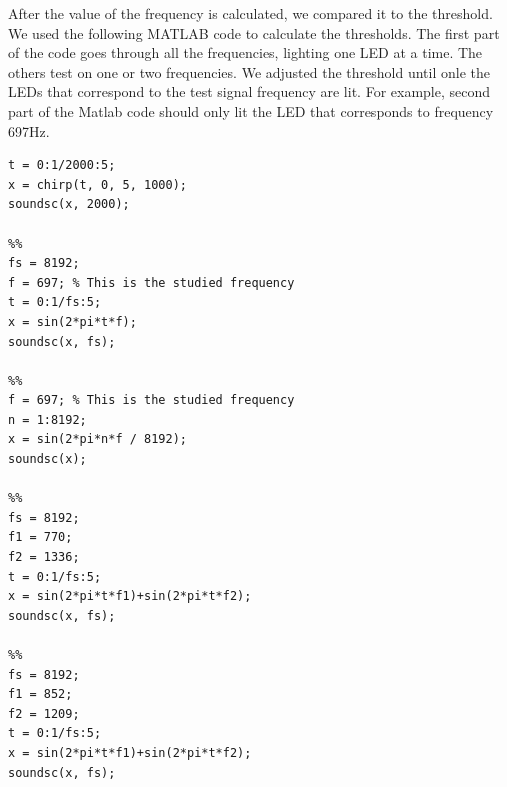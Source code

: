After the value of the frequency is calculated, we compared it to the threshold. We used the following MATLAB code to calculate the thresholds. The first part of the code goes through all the frequencies, lighting one LED at a time. The others test on one or two frequencies. We adjusted the threshold until onle the LEDs that correspond to the test signal frequency are lit. For example, second part of the Matlab code should only lit the LED that corresponds to frequency 697Hz.

\begin{lstlisting}
t = 0:1/2000:5;
x = chirp(t, 0, 5, 1000);
soundsc(x, 2000);

%%
fs = 8192;
f = 697; % This is the studied frequency
t = 0:1/fs:5;
x = sin(2*pi*t*f);
soundsc(x, fs);

%%
f = 697; % This is the studied frequency
n = 1:8192;
x = sin(2*pi*n*f / 8192);
soundsc(x);

%%
fs = 8192;
f1 = 770;
f2 = 1336;
t = 0:1/fs:5;
x = sin(2*pi*t*f1)+sin(2*pi*t*f2);
soundsc(x, fs);

%%
fs = 8192;
f1 = 852;
f2 = 1209;
t = 0:1/fs:5;
x = sin(2*pi*t*f1)+sin(2*pi*t*f2);
soundsc(x, fs);
\end{lstlisting}